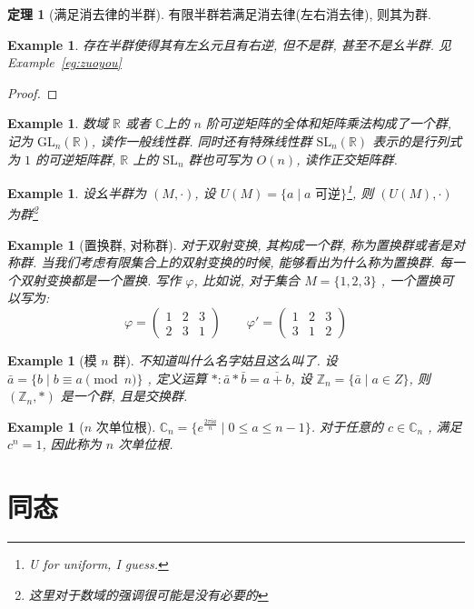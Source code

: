 \documentclass[12pt]{ctexart}
\theoremstyle{definition}
\theoremstyle{definition}
\newtheorem{thm}[definition]{定理}
\theoremstyle{plain}
\newtheorem{exam}[definition]{Example}
\theoremstyle{remark}
\begin{document}
\begin{thm}[满足消去律的半群] 
有限半群若满足消去律(左右消去律), 则其为群.
\end{thm}

\begin{exam}
	存在半群使得其有左幺元且有右逆, 但不是群, 甚至不是幺半群. 见Example~\ref{eg:zuoyou}
\end{exam}
\begin{proof}
\end{proof}

\begin{exam}
	数域 \(\mathbb{R}\) 或者 \(\mathbb{C}\)上的 \(n\) 阶可逆矩阵的全体和矩阵乘法构成了一个群, 记为 \(\text{GL}_{n} (\mathbb{R})\), 读作一般线性群. 同时还有特殊线性群 \(\text{SL}_{n} (\mathbb{R})\) 表示的是行列式为 \(1\) 的可逆矩阵群, \(\mathbb{R}\) 上的 \(\text{SL} _{n}\) 群也可写为 \(O(n)\), 读作正交矩阵群. 
\end{exam}
\begin{exam}
	设幺半群为 \( (M , \cdot )\), 设 \(U (M) = \{ a \mid a \text{ 可逆}\}\)\footnote{U for uniform, I guess.}, 则 \(( U (M), \cdot)\) 为群\footnote{这里对于数域的强调很可能是没有必要的}
\end{exam}
\begin{exam}[置换群, 对称群]\label{eg:sym}
	对于双射变换, 其构成一个群, 称为置换群或者是对称群. 当我们考虑有限集合上的双射变换的时候, 能够看出为什么称为置换群. 每一个双射变换都是一个置换. 写作 \(\varphi\), 比如说, 对于集合 \(M = \{ 1, 2 ,3 \}\) , 一个置换可以写为: 
	\begin{equation}
	\varphi = 
	\begin{pmatrix}
		1 & 2 & 3 \\ 
		2 & 3 & 1 
	\end{pmatrix}
	\qquad \varphi' = 
	\begin{pmatrix}
		1 & 2 & 3 \\ 
		3 & 1 & 2 
	\end{pmatrix}
	\end{equation}
\end{exam}

\begin{exam}[模 \(n\) 群]
	不知道叫什么名字姑且这么叫了. 
	设 \(\bar a = \{ b \mid b \equiv a \pmod{n}\}\) , 定义运算 \(* \colon \bar a * \bar b = \overline{a + b}\), 设 \(\mathbb{Z} _{n} = \{\bar a \mid a \in Z \}\), 则 \((\mathbb{Z}_{n} , *)\) 是一个群, 且是交换群. 
\end{exam}

\begin{exam}[\(n\) 次单位根]
	\(\mathbb{C} _{n} = \{ e ^{\frac{2\pi \mathrm i a}{n}} \mid  0 \le a \le n-1\}\). 
	对于任意的 \(c \in \mathbb{C}_{n}\) , 满足 \(c ^{n} = 1\), 因此称为 \(n\) 次单位根. 
\end{exam}


\section{同态}\label{sec:hom}
\end{document}
